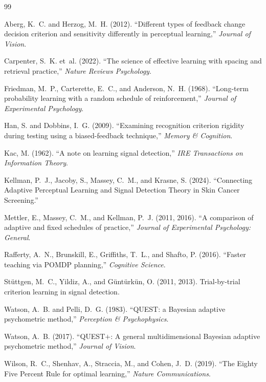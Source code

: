 \documentclass[11pt]{article}
\begin{document}
\begin{thebibliography}{99}\small

Aberg, K.~C. and Herzog, M.~H. (2012).
``Different types of feedback change decision criterion and sensitivity differently in perceptual learning,'' \emph{Journal of Vision}.

Carpenter, S.~K. et~al. (2022).
``The science of effective learning with spacing and retrieval practice,'' \emph{Nature Reviews Psychology}.

Friedman, M.~P., Carterette, E.~C., and Anderson, N.~H. (1968).
``Long-term probability learning with a random schedule of reinforcement,'' \emph{Journal of Experimental Psychology}.

Han, S. and Dobbins, I.~G. (2009).
``Examining recognition criterion rigidity during testing using a biased-feedback technique,'' \emph{Memory \& Cognition}.

Kac, M. (1962).
``A note on learning signal detection,'' \emph{IRE Transactions on Information Theory}.

Kellman, P.~J., Jacoby, S., Massey, C.~M., and Krasne, S. (2024).
``Connecting Adaptive Perceptual Learning and Signal Detection Theory in Skin Cancer Screening.''

Mettler, E., Massey, C.~M., and Kellman, P.~J. (2011, 2016).
``A comparison of adaptive and fixed schedules of practice,'' \emph{Journal of Experimental Psychology: General}.

Rafferty, A.~N., Brunskill, E., Griffiths, T.~L., and Shafto, P. (2016).
``Faster teaching via POMDP planning,'' \emph{Cognitive Science}.

St\"uttgen, M.~C., Yildiz, A., and G\"unt\"urk\"un, O. (2011, 2013).
Trial-by-trial criterion learning in signal detection.

Watson, A.~B. and Pelli, D.~G. (1983).
``QUEST: a Bayesian adaptive psychometric method,'' \emph{Perception \& Psychophysics}.

Watson, A.~B. (2017).
``QUEST$+$: A general multidimensional Bayesian adaptive psychometric method,'' \emph{Journal of Vision}.

Wilson, R.~C., Shenhav, A., Straccia, M., and Cohen, J.~D. (2019).
``The Eighty Five Percent Rule for optimal learning,'' \emph{Nature Communications}.

\end{thebibliography}
\end{document}

